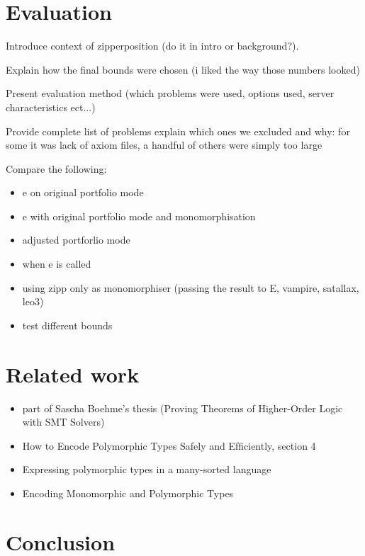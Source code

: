 \documentclass{article}
\begin{document}
\section{Evaluation}

Introduce context of zipperposition (do it in intro or background?).

Explain how the final bounds were chosen (i liked the way those numbers looked)

Present evaluation method (which problems were used, options used, server characteristics ect...)



Provide complete list of problems explain which ones we excluded and why: for some it was lack of axiom files, a handful of others were simply too large

Compare the following:
    \begin{itemize}
        \item e on original portfolio mode
        \item e with original portfolio mode and monomorphisation
        \item adjusted portforlio mode 

        \item when e is called
        \item using zipp only as monomorphiser (passing the result to E, vampire, satallax, leo3)

        \item test different bounds
    \end{itemize}


\section{Related work}

\begin{itemize}
    \item part of Sascha Boehme's thesis (Proving Theorems of Higher-Order Logic with SMT Solvers)
    \item How to Encode Polymorphic Types Safely and Efﬁciently, section 4

    \item Expressing polymorphic types in a many-sorted language
    \item Encoding Monomorphic and Polymorphic Types
\end{itemize}

\section{Conclusion}


\end{document}
